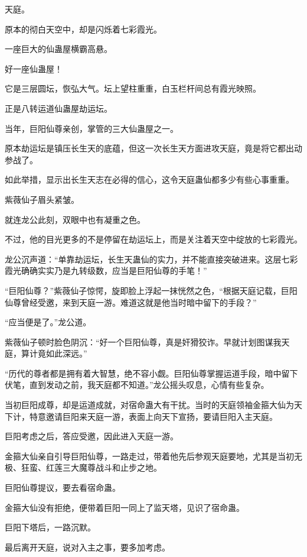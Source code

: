 
\begin{this_body}

天庭。

原本的彻白天空中，却是闪烁着七彩霞光。

一座巨大的仙蛊屋横霸高悬。

好一座仙蛊屋！

它是三层圆坛，恢弘大气。坛上望柱重重，白玉栏杆间总有霞光映照。

正是八转运道仙蛊屋劫运坛。

当年，巨阳仙尊亲创，掌管的三大仙蛊屋之一。

原本劫运坛是镇压长生天的底蕴，但这一次长生天方面进攻天庭，竟是将它都出动参战了。

如此举措，显示出长生天志在必得的信心，这令天庭蛊仙都多少有些心事重重。

紫薇仙子眉头紧皱。

就连龙公此刻，双眼中也有凝重之色。

不过，他的目光更多的不是停留在劫运坛上，而是关注着天空中绽放的七彩霞光。

龙公沉声道：“单靠劫运坛，长生天蛊仙的实力，并不能直接突破进来。这层七彩霞光确确实实乃是九转级数，应当是巨阳仙尊的手笔！”

“巨阳仙尊？”紫薇仙子惊愕，旋即脸上浮起一抹恍然之色，“根据天庭记载，巨阳仙尊曾经受邀，来到天庭一游。难道这就是他当时暗中留下的手段？”

“应当便是了。”龙公道。

紫薇仙子顿时脸色阴沉：“好一个巨阳仙尊，真是奸猾狡诈。早就计划图谋我天庭，算计竟如此深远。”

“历代的尊者都是拥有着大智慧，绝不容小觑。巨阳仙尊掌握运道手段，暗中留下伏笔，直到发动之前，我天庭都不知道。”龙公摇头叹息，心情有些复杂。

当初巨阳成尊，却是运道成就，对宿命蛊大有干扰。当时的天庭领袖金箍大仙为天下计，特意邀请巨阳来天庭一游，表面上向天下宣扬，要请巨阳入主天庭。

巨阳考虑之后，答应受邀，因此进入天庭一游。

金箍大仙亲自引导巨阳仙尊，一路走过，带着他先后参观天庭要地，尤其是当初无极、狂蛮、红莲三大魔尊战斗和止步之地。

巨阳仙尊提议，要去看宿命蛊。

金箍大仙没有拒绝，便带着巨阳一同上了监天塔，见识了宿命蛊。

巨阳下塔后，一路沉默。

最后离开天庭，说对入主之事，要多加考虑。


\end{this_body}
